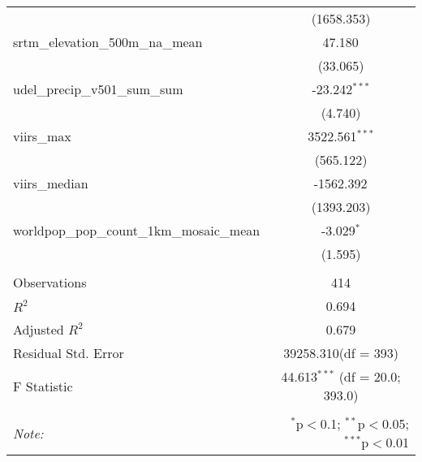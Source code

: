 \begin{table}[!htbp]
\begin{tabular}{@{\extracolsep{5pt}}lc}
  & (1658.353) \\
 srtm_elevation_500m_na_mean & 47.180$^{}$ \\
  & (33.065) \\
 udel_precip_v501_sum_sum & -23.242$^{***}$ \\
  & (4.740) \\
 viirs_max & 3522.561$^{***}$ \\
  & (565.122) \\
 viirs_median & -1562.392$^{}$ \\
  & (1393.203) \\
 worldpop_pop_count_1km_mosaic_mean & -3.029$^{*}$ \\
  & (1.595) \\
\hline \\[-1.8ex]
 Observations & 414 \\
 $R^2$ & 0.694 \\
 Adjusted $R^2$ & 0.679 \\
 Residual Std. Error & 39258.310(df = 393)  \\
 F Statistic & 44.613$^{***}$ (df = 20.0; 393.0) \\
\hline
\hline \\[-1.8ex]
\textit{Note:} & \multicolumn{1}{r}{$^{*}$p$<$0.1; $^{**}$p$<$0.05; $^{***}$p$<$0.01} \\
\end{tabular}
\end{table}